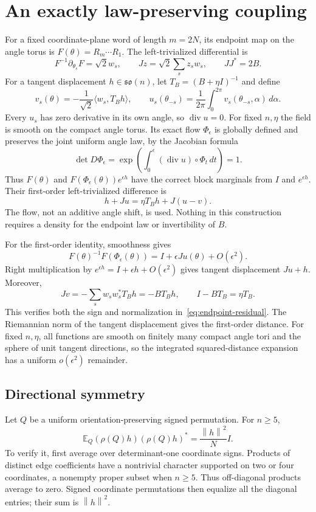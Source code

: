 \documentclass[11pt]{article}
\theoremstyle{definition}\newtheorem{definition}[theorem]{Definition}
\theoremstyle{remark}\newtheorem{remark}[theorem]{Remark}
\DeclareMathOperator{\diver}{div}
\newcommand{\E}{\mathbb E}
\newcommand{\g}{\mathfrak{so}(n)}
\newcommand{\ip}[2]{\langle#1,#2\rangle}
\newcommand{\norm}[1]{\left\lVert#1\right\rVert}
\begin{document}
\section{An exactly law-preserving coupling}\label{sec:coupling}
For a fixed coordinate-plane word of length $m=2N$, its endpoint map on the angle torus is $F(\theta)=R_m\cdots R_1$. The left-trivialized differential is
\[
 F^{-1}\partial_{\theta_s}F=\sqrt2w_s,\qquad
 Jz=\sqrt2\sum_s z_sw_s,\qquad JJ^*=2B.
\]
For a tangent displacement $h\in\g$, let $T_B=(B+\eta I)^{-1}$ and define
\begin{equation}\label{eq:fields}
 v_s(\theta)=-\frac1{\sqrt2}\ip{w_s}{T_Bh},\qquad
 u_s(\theta_{-s})=\frac1{2\pi}\int_0^{2\pi}
                       v_s(\theta_{-s},\alpha)\,d\alpha.
\end{equation}
Every $u_s$ has zero derivative in its own angle, so $\diver u=0$. For fixed $n,\eta$ the field is smooth on the compact angle torus. Its exact flow $\Phi_\epsilon$ is globally defined and preserves the joint uniform angle law, by the Jacobian formula
\[
 \det D\Phi_\epsilon
 =\exp\left(\int_0^\epsilon(\diver u)\circ\Phi_t\,dt\right)=1.
\]
Thus $F(\theta)$ and $F(\Phi_\epsilon(\theta))e^{\epsilon h}$ have the correct block marginals from $I$ and $e^{\epsilon h}$. Their first-order left-trivialized difference is
\begin{equation}\label{eq:endpoint-residual}
 h+Ju=\eta T_Bh+J(u-v).
\end{equation}
The flow, not an additive angle shift, is used. Nothing in this construction requires a density for the endpoint law or invertibility of $B$.

For the first-order identity, smoothness gives
\[
 F(\theta)^{-1}F(\Phi_\epsilon(\theta))
 =I+\epsilon Ju(\theta)+O(\epsilon^2).
\]
Right multiplication by $e^{\epsilon h}=I+\epsilon h+O(\epsilon^2)$ gives tangent displacement $Ju+h$. Moreover,
\[
 Jv=-\sum_s w_sw_s^*T_Bh=-BT_Bh,
 \qquad I-BT_B=\eta T_B.
\]
This verifies both the sign and normalization in~\eqref{eq:endpoint-residual}. The Riemannian norm of the tangent displacement gives the first-order distance. For fixed $n,\eta$, all functions are smooth on finitely many compact angle tori and the sphere of unit tangent directions, so the integrated squared-distance expansion has a uniform $o(\epsilon^2)$ remainder.


\subsection{Directional symmetry}
Let $Q$ be a uniform orientation-preserving signed permutation. For $n\ge5$,
\begin{equation}\label{eq:symmetry}
 \E_Q(\rho(Q)h)(\rho(Q)h)^*=\frac{\norm h^2}{N}I.
\end{equation}
To verify it, first average over determinant-one coordinate signs. Products of distinct edge coefficients have a nontrivial character supported on two or four coordinates, a nonempty proper subset when $n\ge5$. Thus off-diagonal products average to zero. Signed coordinate permutations then equalize all the diagonal entries; their sum is $\norm h^2$.
\end{document}
